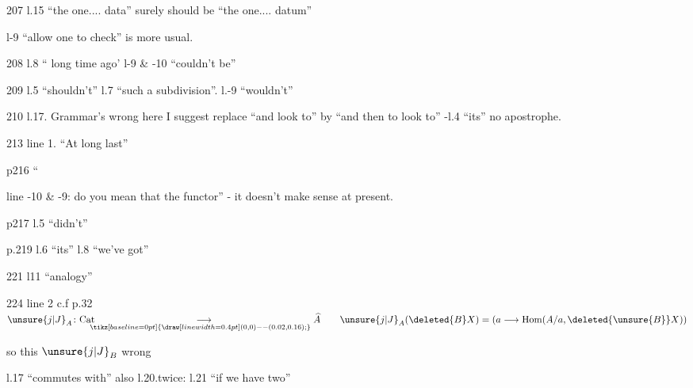 207 l.15 ``the one.... data'' surely should be ``the one.... datum''

l-9 ``allow one to check'' is more usual.\hfill{}

208 l.8 `` long time ago' l-9 \& -10 ``couldn't be''

209 l.5 ``shouldn't'' l.7 ``such a subdivision''. l.-9 ``wouldn't''

210 l.17. Grammar's wrong here I suggest replace ``and look to'' by ``and then to look to'' -l.4 ``its'' no apostrophe.

213 line 1. ``At long last''

p216  `` 

line -10 \& -9: do you mean that the functor'' - it doesn't make sense at present.

p217 l.5 ``didn't''

p.219 l.6 ``its'' l.8 ``we've got''

221 l11 ``analogy''

224 line 2 c.f p.32 $\unsure{j|J}_A\colon\mathrm{Cat}\underset{\hspace{-0.8em}\tikz[baseline=0pt]{\draw[line width=0.4pt] (0,0)--(0.02,0.16);}}{\longrightarrow}\widehat A\qquad \unsure{j|J}_A(\deleted{B}X)=(a\longrightarrow\operatorname{Hom}(A/a,\deleted{\unsure{B}}X))$

so  this  $\unsure{j|J}_B$   wrong

l.17 ``commutes with'' also l.20.twice: l.21 ``if we have two''

